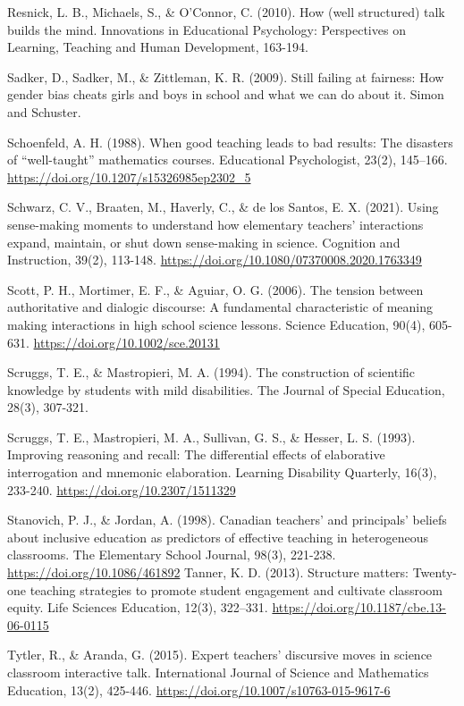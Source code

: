 \documentclass{sig-alternate} %
\begin{document}
Resnick, L. B., Michaels, S., \& O’Connor, C. (2010). How (well structured) talk builds the mind. Innovations in Educational Psychology: Perspectives on Learning, Teaching and Human Development, 163-194.

Sadker, D., Sadker, M., \& Zittleman, K. R. (2009). Still failing at fairness: How gender bias cheats girls and boys in school and what we can do about it. Simon and Schuster.

Schoenfeld, A. H. (1988). When good teaching leads to bad results: The disasters of “well-taught” mathematics courses. Educational Psychologist, 23(2), 145–166. \url{https://doi.org/10.1207/s15326985ep2302_5}

Schwarz, C. V., Braaten, M., Haverly, C., \& de los Santos, E. X. (2021). Using sense-making moments to understand how elementary teachers’ interactions expand, maintain, or shut down sense-making in science. Cognition and Instruction, 39(2), 113-148. \url{https://doi.org/10.1080/07370008.2020.1763349}

Scott, P. H., Mortimer, E. F., \& Aguiar, O. G. (2006). The tension between authoritative and dialogic discourse: A fundamental characteristic of meaning making interactions in high school science lessons. Science Education, 90(4), 605-631. \url{https://doi.org/10.1002/sce.20131}

Scruggs, T. E., \& Mastropieri, M. A. (1994). The construction of scientific knowledge by students with mild disabilities. The Journal of Special Education, 28(3), 307-321.

Scruggs, T. E., Mastropieri, M. A., Sullivan, G. S., \& Hesser, L. S. (1993). Improving reasoning and recall: The differential effects of elaborative interrogation and mnemonic elaboration. Learning Disability Quarterly, 16(3), 233-240. \url{https://doi.org/10.2307/1511329}

Stanovich, P. J., \& Jordan, A. (1998). Canadian teachers' and principals' beliefs about inclusive education as predictors of effective teaching in heterogeneous classrooms. The Elementary School Journal, 98(3), 221-238. \url{https://doi.org/10.1086/461892}
\newpage
Tanner, K. D. (2013). Structure matters: Twenty-one teaching strategies to promote student engagement and cultivate classroom equity. Life Sciences Education, 12(3), 322–331. \url{https://doi.org/10.1187/cbe.13-06-0115}

Tytler, R., \& Aranda, G. (2015). Expert teachers’ discursive moves in science classroom interactive talk. International Journal of Science and Mathematics Education, 13(2), 425-446. \url{https://doi.org/10.1007/s10763-015-9617-6}
\end{document}
